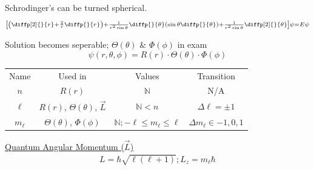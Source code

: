 \documentclass[8pt]{minimal}
\begin{document}
        Schrodinger's can be turned spherical.
        \begin{equation*}
            {\scriptstyle \left[ \left( \diffp[2]{}{r} + \frac{2}{r}\diffp{}{r} \right) + \frac{1}{r^2\sin\theta}\diffp{}{\theta}\left( \sin\theta \diffp{}{\theta} \right) + \frac{1}{r^2\sin\theta}\diffp[2]{}{\theta}\right]\psi = E\psi}
        \end{equation*}

        Solution becomes seperable; $\Theta(\theta)$ \& $\Phi(\phi)$ in exam
        \begin{equation*}
            \psi(r,\theta,\phi) = R(r) \cdot \Theta(\theta) \cdot \Phi(\phi)
        \end{equation*}

        \begin{tabular}{c | c | c | c}
            Name        & Used in   &   Values & Transition\\
            $n$         & $R(r)$    &   $\mathbb{N}$ & N/A\\
            $\ell$      & $R(r)$, $\Theta(\theta)$, $\vec{L}$  &   $\mathbb{N} < n$ & $\Delta \ell = \pm 1$\\
            $m_\ell$    & $\Theta(\theta)$, $\Phi(\phi)$    &   $\mathbb{N}; -\ell \leq m_\ell \leq \ell$ & $\Delta m_\ell \in {-1,0,1}$
        \end{tabular}

    \underline{Quantum Angular Momentum ($\vec{L}$)}
        \begin{gather*}
            L = \hbar \sqrt{\ell(\ell + 1)};
            L_z = m_\ell \hbar
        \end{gather*}
\end{document}
